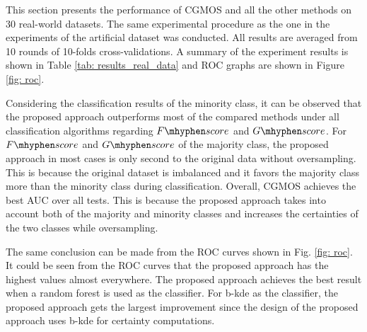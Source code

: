 \documentclass{iitthesis}
\newcommand\fscore{\mathop{F\mhyphen score}}
\newcommand\gscore{\mathop{G\mhyphen score}}
\begin{document}
This section presents the performance of CGMOS and all the other methods on 30 real-world datasets. The same experimental procedure as the one in the experiments of the artificial dataset was conducted. All results are averaged from 10 rounds of 10-folds cross-validations. A summary of the experiment results is shown in Table \ref{tab: results_real_data} and ROC graphs are shown in Figure \ref{fig: roc}.

\begin{table}[ht]
\caption{A summary of $p$-values of statistical significant tests of classification results using CGMOS against each of all the other competitors. }
\begin{center}
\end{center}
\label{tab: signrank}
\end{table}

Considering the classification results of the minority class, it can be observed that the proposed approach outperforms most of the compared methods under all classification algorithms regarding $\fscore$ and $\gscore$. For $\fscore$ and $\gscore$ of the majority class, the proposed approach in most cases is only second to the original data without oversampling. This is because the original dataset is imbalanced and it favors the majority class more than the minority class during classification. Overall, CGMOS achieves the best AUC over all tests. This is because the proposed approach takes into account both of the majority and minority classes and increases the certainties of the two classes while oversampling.

The same conclusion can be made from the ROC curves shown in Fig. \ref{fig: roc}. It could be seen from the ROC curves that the proposed approach has the highest values almost everywhere. The proposed approach achieves the best result when a random forest is used as the classifier. For b-kde as the classifier, the proposed approach gets the largest improvement
since the design of the proposed approach uses b-kde for certainty computations.
\end{document}

